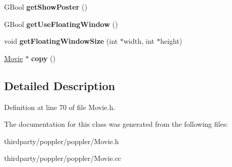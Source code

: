 \begin{DoxyCompactItemize}
G\+Bool {\bfseries get\+Show\+Poster} ()
\item 
\mbox{\label{class_movie_af85d02494e00546cba46515aa1909743}} 
G\+Bool {\bfseries get\+Use\+Floating\+Window} ()
\item 
\mbox{\label{class_movie_af2c902baf6677915cdda873635fb313f}} 
void {\bfseries get\+Floating\+Window\+Size} (int $\ast$width, int $\ast$height)
\item 
\mbox{\label{class_movie_a6057ca5ae130e6b98f4efd871965a056}} 
\hyperlink{class_movie}{Movie} $\ast$ {\bfseries copy} ()
\end{DoxyCompactItemize}


\subsection{Detailed Description}


Definition at line 70 of file Movie.\+h.



The documentation for this class was generated from the following files\+:\begin{DoxyCompactItemize}
\item 
thirdparty/poppler/poppler/Movie.\+h\item 
thirdparty/poppler/poppler/Movie.\+cc\end{DoxyCompactItemize}
